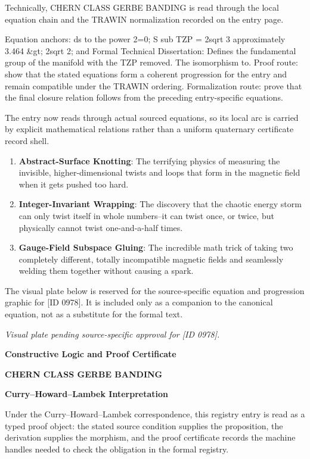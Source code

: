 Technically, CHERN CLASS GERBE BANDING is read through the local equation chain and the TRAWIN normalization recorded on the entry page.

Equation anchors: ds to the power 2=0; S sub TZP = 2sqrt 3 approximately 3.464 \&gt; 2sqrt 2; and Formal Technical Dissertation: Defines the fundamental group of the manifold with the TZP removed. The isomorphism to. Proof route: show that the stated equations form a coherent progression for the entry and remain compatible under the TRAWIN ordering. Formalization route: prove that the final closure relation follows from the preceding entry-specific equations.

The entry now reads through actual sourced equations, so its local arc is carried by explicit mathematical relations rather than a uniform quaternary certificate record shell.
\endgroup

\begin{enumerate}[leftmargin=1.6em,itemsep=6pt,topsep=4pt]
\item \textbf{Abstract-Surface Knotting}: The terrifying physics of measuring the invisible, higher-dimensional twists and loops that form in the magnetic field when it gets pushed too hard.
\item \textbf{Integer-Invariant Wrapping}: The discovery that the chaotic energy storm can only twist itself in whole numbers--it can twist once, or twice, but physically cannot twist one-and-a-half times.
\item \textbf{Gauge-Field Subspace Gluing}: The incredible math trick of taking two completely different, totally incompatible magnetic fields and seamlessly welding them together without causing a spark.
\end{enumerate}

\begingroup\footnotesize\sloppy
The visual plate below is reserved for the source-specific equation and progression graphic for [ID 0978]. It is included only as a companion to the canonical equation, not as a substitute for the formal text.
\par\endgroup
\begingroup\footnotesize\itshape
Visual plate pending source-specific approval for [ID 0978].
\par\endgroup

\clearpage
\begingroup\tzpsupportsetup
\noindent\textbf{\fontsize{10.8pt}{12.8pt}\selectfont [ID 0978] Constructive Logic and Proof Certificate}\par
\noindent\textbf{\fontsize{10pt}{12pt}\selectfont CHERN CLASS GERBE BANDING}\par
\vspace{0.45em}
\begingroup
\footnotesize
\setlength{\parskip}{0.22em}
\setlength{\parindent}{0pt}
\noindent\textbf{Curry--Howard--Lambek Interpretation}\par
Under the Curry--Howard--Lambek correspondence, this registry entry is read as a typed proof
object: the stated source condition supplies the proposition, the derivation supplies the
morphism, and the proof certificate records the machine handles needed to check the obligation
in the formal registry.

